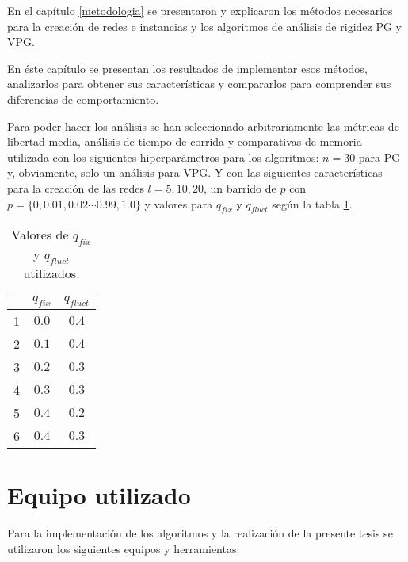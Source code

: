 
\pgfplotsset{width=6.5cm}

En el capítulo \ref{metodologia} se presentaron y explicaron los métodos necesarios para la creación de redes e instancias y los algoritmos de análisis de rigidez PG y VPG. 

En éste capítulo se presentan los resultados de implementar esos métodos, analizarlos para obtener sus características y compararlos para comprender sus diferencias de comportamiento.

Para poder hacer los análisis se han seleccionado arbitrariamente las métricas de libertad media, análisis de tiempo de corrida y comparativas de memoria utilizada con los siguientes hiperparámetros para los algoritmos: $n=30$ para PG y, obviamente, solo un análisis para VPG. Y con las siguientes características para la creación de las redes $l=5,10,20$, un barrido de $p$ con $p=\{0,0.01,0.02 \cdots 0.99, 1.0\}$ y valores para $q_{fix}$ y $q_{fluct}$ según la  tabla \ref{table:qfix-fluct}.

\renewcommand{\arraystretch}{1.3}
\captionsetup[table]{name=Tabla}
\begin{table}[ht]
\centering
\begin{tabular}{ccc}
\hline
& $q_{fix}$ & $q_{fluct}$ \\
\hline
1 & $0.0$ & $0.4$ \\
2 & $0.1$ & $0.4$ \\
3 & $0.2$ & $0.3$ \\
4 & $0.3$ & $0.3$ \\
5 & $0.4$ & $0.2$ \\
6 & $0.4$ & $0.3$ \\
\hline
\end{tabular}
\caption{Valores de $q_{fix}$ y $q_{fluct}$ utilizados.}
\label{table:qfix-fluct}
\end{table}

\section{Equipo utilizado}
Para la implementación de los algoritmos y la realización de la presente tesis se utilizaron los siguientes equipos y herramientas:

